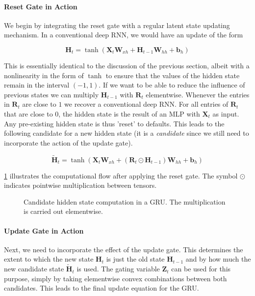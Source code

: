\paragraph{Reset Gate in Action}

We begin by integrating the reset gate with a regular latent state updating mechanism. In a conventional deep RNN, we would have an update of the form

$$\mathbf{H}_t = \tanh(\mathbf{X}_t \mathbf{W}_{xh} + \mathbf{H}_{t-1}\mathbf{W}_{hh} + \mathbf{b}_h)$$

This is essentially identical to the discussion of the previous section, albeit with a nonlinearity in the form of $\tanh$ to ensure that the values of the hidden state remain in the interval $(-1, 1)$.
If we want to be able to reduce the influence of previous states we can multiply $\mathbf{H}_{t-1}$ with $\mathbf{R}_t$ elementwise. Whenever the entries in $\mathbf{R}_t$ are close to $1$ we recover a conventional deep RNN. For all entries of $\mathbf{R}_t$ that are close to $0$, the hidden state is the result of an MLP with $\mathbf{X}_t$ as input. Any pre-existing hidden state is thus 'reset' to defaults. This leads to the following candidate for a new hidden state (it is a \textit{candidate} since we still need to incorporate the action of the update gate).

$$\tilde{\mathbf{H}}_t = \tanh(\mathbf{X}_t \mathbf{W}_{xh} + \left(\mathbf{R}_t \odot \mathbf{H}_{t-1}\right) \mathbf{W}_{hh} + \mathbf{b}_h)$$

\cref{fig:gru_2} illustrates the computational flow after applying the reset gate. The symbol $\odot$ indicates pointwise multiplication between tensors.

\begin{figure}[hpt]
    \centering
    
    \caption{Candidate hidden state computation in a GRU. The multiplication is carried out elementwise.}
    \label{fig:gru_2}
\end{figure}

\paragraph{Update Gate in Action}

Next, we need to incorporate the effect of the update gate. This determines the extent to which the new state $\mathbf{H}_t$ is just the old state $\mathbf{H}_{t-1}$ and by how much the new candidate state $\tilde{\mathbf{H}}_t$ is used. The gating variable $\mathbf{Z}_t$ can be used for this purpose, simply by taking elementwise convex combinations between both candidates. This leads to the final update equation for the GRU.


